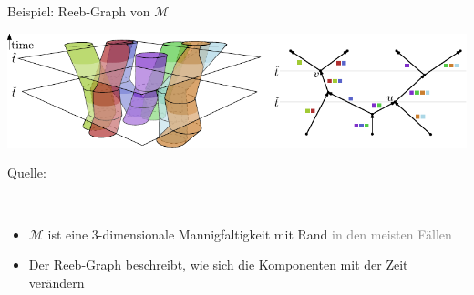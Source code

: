 \documentclass[
wide,
10pt,
xcolor={x11names,svgnames},
hyperref={pdfauthor={Jannes Bantje},colorlinks,urlcolor=maincolor,hidelinks=false,linkcolor=maincolor},
pantone312, 	%
euler-digits,
]{beamer}
\theoremstyle{definition}
\begin{document}
\begin{frame}[t]{Beispiel: Reeb-Graph von $\mathcal{M}$}
    \begin{center}
        \includegraphics[width=1.05\textwidth]{Bilder/manifold.pdf}\\[-5pt]
        \begin{minipage}{1\textwidth}
            \raggedleft\small Quelle: \cite[Fig.~2]{buchin2015}
        \end{minipage}\\[.5em] \pause
        \begin{itemize}[<+->]
            \item $\mathcal{M}$ ist eine 3-dimensionale Mannigfaltigkeit mit Rand \textcolor{gray}{in den meisten Fällen}
            \item Der Reeb-Graph beschreibt, wie sich die Komponenten mit der Zeit verändern
        \end{itemize}
    \end{center}
\end{frame}
\end{document}
